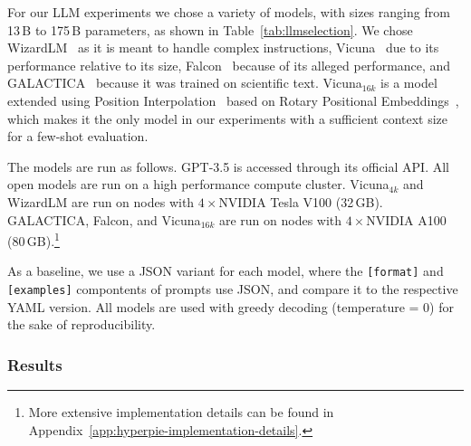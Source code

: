 For our LLM experiments we chose a variety of models, with sizes ranging from 13\,B to 175\,B parameters, as shown in Table~\ref{tab:llmselection}.
We chose WizardLM~\cite{xu2023wizardlm2023} as it is meant to handle complex instructions, 
Vicuna~\cite{vicuna2023} due to its performance relative to its size, 
Falcon~\cite{falcon40b-huggingface} because of its alleged performance, 
and GALACTICA~\cite{GALACTICA2022} because it was trained on scientific text.
Vicuna${}_{16k}$ is a model extended using Position Interpolation~\cite{chen2023} based on Rotary Positional Embeddings~\cite{su2021}, which makes it the only model in our experiments with a sufficient context size for a few-shot evaluation.

The models are run as follows. GPT-3.5 is accessed through its official API.
All open models are run on a high performance compute cluster.
Vicuna${}_{4k}$ and WizardLM are run on nodes with $4\times$NVIDIA Tesla V100 (32\,GB).
GALACTICA, Falcon, and Vicuna${}_{16k}$ are run on nodes with $4\times$NVIDIA A100 (80\,GB).\footnote{More extensive implementation details can be found in Appendix~\ref{app:hyperpie-implementation-details}.}

As a baseline, we use a JSON variant for each model, where the \texttt{[format]} and \texttt{[examples]} compontents of prompts use JSON, and compare it to the respective YAML version. All models are used with greedy decoding (temperature = 0) for the sake of reproducibility.



\subsubsection{Results}

